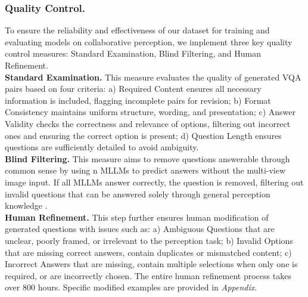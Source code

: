 \documentclass[letterpaper]{article} %
\begin{document}
\subsubsection{Quality Control.}
To ensure the reliability and effectiveness of our dataset for training and evaluating models on collaborative perception, we implement three key quality control measures: Standard Examination, Blind Filtering, and Human Refinement. 
\\ \indent
\textbf{Standard Examination.} 
This measure evaluates the quality of generated VQA pairs based on four criteria:
a) Required Content ensures all necessary information is included, flagging incomplete pairs for revision;
b) Format Consistency maintains uniform structure, wording, and presentation;
c) Answer Validity checks the correctness and relevance of options, filtering out incorrect ones and ensuring the correct option is present;
d) Question Length ensures questions are sufficiently detailed to avoid ambiguity.
\\ \indent
\textbf{Blind Filtering.}
This measure aims to remove questions answerable through common sense by using n MLLMs to predict answers without the multi-view image input. If all MLLMs answer correctly, the question is removed, filtering out invalid questions that can be answered solely through general perception knowledge \cite{zhao2025urbanvideo}.
\\ \indent
\textbf{Human Refinement.}
This step further ensures human modification of generated questions with issues such as:
a) Ambiguous Questions that are unclear, poorly framed, or irrelevant to the perception task;
b) Invalid Options that are missing correct answers, contain duplicates or mismatched content;
c) Incorrect Answers that are missing, contain multiple selections when only one is required, or are incorrectly chosen.
The entire human refinement process takes over 800 hours. Specific modified examples are provided in \textit{Appendix}.
\end{document}

